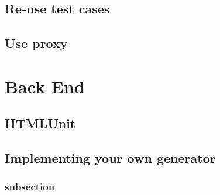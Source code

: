 \documentclass[a4paper,11pt]{kth-mag}
\begin{document}


\section{Re-use test cases}

\section{Use proxy}

\chapter{Back End}

\section{HTMLUnit}


\section{Implementing your own generator}
\label{backendimpl}

\subsection{subsection}
\end{document}
